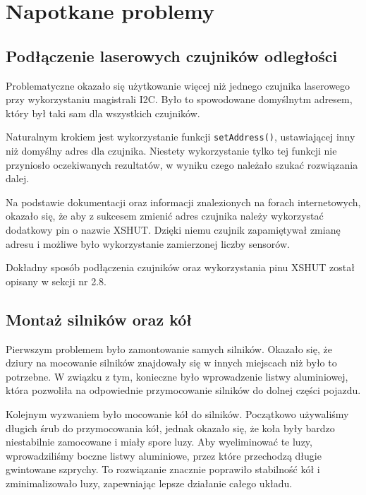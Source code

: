 \documentclass{report}
\begin{document}
\section{\LARGE Napotkane problemy}
\subsection{\Large Podłączenie laserowych czujników odległości}
%
%

Problematyczne okazało się użytkowanie więcej niż jednego czujnika laserowego przy wykorzystaniu magistrali I2C. Było to spowodowane domyślnytm adresem, który był taki sam dla wszystkich czujników. 

Naturalnym krokiem jest wykorzystanie funkcji \texttt{setAddress()}, ustawiającej inny niż domyślny adres dla czujnika. Niestety wykorzystanie tylko tej funkcji nie przyniosło oczekiwanych rezultatów, w wyniku czego należało szukać rozwiązania dalej. 

Na podstawie dokumentacji oraz informacji znalezionych na forach internetowych, okazało się, że aby z sukcesem zmienić adres czujnika należy wykorzystać dodatkowy pin o nazwie XSHUT. Dzięki niemu czujnik zapamiętywał zmianę adresu i możliwe było wykorzystanie zamierzonej liczby sensorów. 

Dokładny sposób podłączenia czujników oraz wykorzystania pinu XSHUT został opisany w sekcji nr 2.8.

\subsection{\Large Montaż silników oraz kół}
%
%
Pierwszym problemem było zamontowanie samych silników. Okazało się, że dziury na mocowanie silników znajdowały się w innych miejscach niż było to potrzebne. W związku z tym, konieczne było wprowadzenie listwy aluminiowej, która pozwoliła na odpowiednie przymocowanie silników do dolnej części pojazdu.

Kolejnym wyzwaniem było mocowanie kół do silników. Początkowo używaliśmy długich śrub do przymocowania kół, jednak okazało się, że koła były bardzo niestabilnie zamocowane i miały spore luzy. Aby wyeliminować te luzy, wprowadziliśmy boczne listwy aluminiowe, przez które przechodzą długie gwintowane szprychy. To rozwiązanie znacznie poprawiło stabilność kół i zminimalizowało luzy, zapewniając lepsze działanie całego układu.
\end{document}
